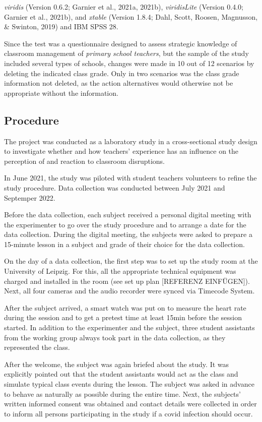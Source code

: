 \documentclass[
  man]{apa6}
\begin{document}
\emph{viridis} (Version 0.6.2; Garnier et al., 2021a, 2021b), \emph{viridisLite} (Version 0.4.0; Garnier et al., 2021b), and \emph{xtable} (Version 1.8.4; Dahl, Scott, Roosen, Magnusson, \& Swinton, 2019) and IBM SPSS 28.

Since the test was a questionnaire designed to assess strategic knowledge of classroom management of \emph{primary school teachers}, but the sample of the study included several types of schools, changes were made in 10 out of 12 scenarios by deleting the indicated class grade. Only in two scenarios was the class grade information not deleted, as the action alternatives would otherwise not be appropriate without the information.

\hypertarget{procedure}{%
\subsection{Procedure}\label{procedure}}

The project was conducted as a laboratory study in a cross-sectional study design to investigate whether and how teachers' experience has an influence on the perception of and reaction to classroom disruptions.

In June 2021, the study was piloted with student teachers volunteers to refine the study procedure. Data collection was conducted between July 2021 and Septemper 2022.

Before the data collection, each subject received a personal digital meeting with the experimenter to go over the study procedure and to arrange a date for the data collection. During the digital meeting, the subjects were asked to prepare a 15-minute lesson in a subject and grade of their choice for the data collection.

On the day of a data collection, the first step was to set up the study room at the University of Leipzig. For this, all the appropriate technical equipment was charged and installed in the room (see set up plan {[}REFERENZ EINFÜGEN{]}). Next, all four cameras and the audio recorder were synced via Timecode System.

After the subject arrived, a smart watch was put on to measure the heart rate during the session and to get a pretest time at least 15min before the session started. In addition to the experimenter and the subject, three student assistants from the working group always took part in the data collection, as they represented the class.

After the welcome, the subject was again briefed about the study. It was explicitly pointed out that the student assistants would act as the class and simulate typical class events during the lesson. The subject was asked in advance to behave as naturally as possible during the entire time. Next, the subjects' written informed consent was obtained and contact details were collected in order to inform all persons participating in the study if a covid infection should occur.
\end{document}
